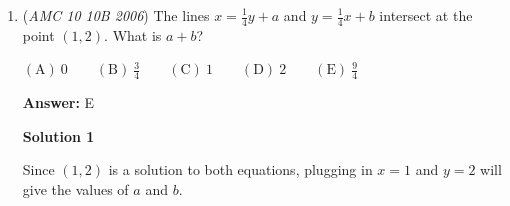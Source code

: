\begin{enumerate}
 \textbf{Answer: }C



\textbf{Solution}

Since $10!$ is divisible by $100$, any \href{https://artofproblemsolving.com/wiki/index.php?title=Factorial}{factorial} greater than $10!$ is also divisible by $100$. The last two \href{https://artofproblemsolving.com/wiki/index.php?title=Digit}{digits} of all factorials greater than $10!$ are $00$, so the last two digits of $10!+11!+...+2006!$ are $00$. (*)

 So all that is needed is the tens digit of the sum $7!+8!+9!$
$7!+8!+9!=5040+40320+362880=408240$

 So the tens digit is $\boxed{\textbf{(C) }4}$.

 (*) A slightly faster method would be to take the $\pmod {100}$ residue of $7! + 8! + 9!.$ Since $7! = 5040,$ we can rewrite the sum as 
 \[5040 + 8\cdot 5040 + 72\cdot 5040 \equiv 40 + 8\cdot 40 + 72\cdot 40 = 40 + 320 + 2880 \equiv 40 \pmod{100}.\] Since the last two digits of the sum is $40$, the tens digit is $\boxed{\textbf{(C) }4}$.

 



\textbf{Solution 1 (Fast calculation)}

To find the tens digit, we need to work in $\bmod \, 100$. Since $100 \mid n!$ for $n \ge 10$, 
 \[7!+8!+9!+\cdots+2006! \equiv 7!+8!+9! \pmod{100}\] Now, we simplify the expression by factoring, 
 \[7!+8!+9! \equiv 7!(1+8+9\cdot8) \equiv7!\cdot81 \pmod{100}\] We won't explicitly calculate the value of $7!$ but rather we will rewrite it as $7!=7\cdot6\cdot5\cdot4\cdot3\cdot2\cdot1=42\cdot120$. Now we will use this to our advantage to calculate the modulo quickly, 
 \[7!\cdot81 \equiv 42 \cdot 20 \cdot 81 \equiv 40 \cdot 81 \equiv 40 \pmod{100}\]Therefore the tens digit is $\boxed{(\textbf{C}) \, 4}$



	\item (\textit{AMC 10 10B 2006}) The lines $x=\frac{1}{4}y+a$ and $y=\frac{1}{4}x+b$ intersect at the point $(1,2)$. What is $a+b$?


 $\mathrm{(A) \ } 0\qquad \mathrm{(B) \ } \frac{3}{4}\qquad \mathrm{(C) \ } 1\qquad \mathrm{(D) \ } 2\qquad \mathrm{(E) \ } \frac{9}{4}$

 \textbf{Answer: }E



\textbf{Solution 1}

Since $(1,2)$ is a solution to both equations, plugging in $x=1$ and $y=2$ will give the values of $a$ and $b$. 


\end{enumerate}
